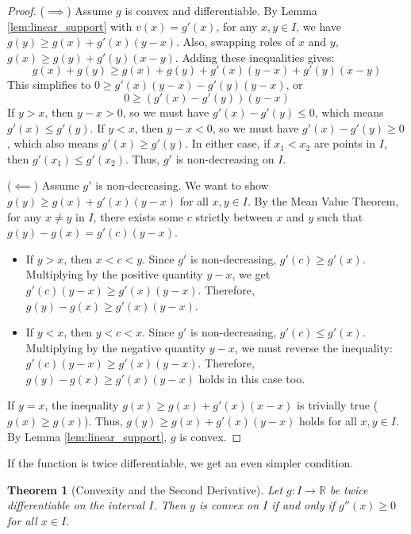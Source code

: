 \documentclass[11pt]{article}
\newtheorem{theorem}{Theorem}[section]
\theoremstyle{definition}
\theoremstyle{remark}
\begin{document}
\begin{proof}
($\implies$) Assume $g$ is convex and differentiable. By Lemma \ref{lem:linear_support} with $v(x)=g'(x)$, for any $x, y \in I$, we have $g(y) \ge g(x) + g'(x)(y-x)$. Also, swapping roles of $x$ and $y$, $g(x) \ge g(y) + g'(y)(x-y)$. Adding these inequalities gives:
\[ g(x)+g(y) \ge g(x)+g(y) + g'(x)(y-x) + g'(y)(x-y) \]
This simplifies to $0 \ge g'(x)(y-x) - g'(y)(y-x)$, or
\[ 0 \ge (g'(x) - g'(y))(y-x) \]
If $y > x$, then $y-x > 0$, so we must have $g'(x) - g'(y) \le 0$, which means $g'(x) \le g'(y)$.
If $y < x$, then $y-x < 0$, so we must have $g'(x) - g'(y) \ge 0$, which also means $g'(x) \ge g'(y)$.
In either case, if $x_1 < x_2$ are points in $I$, then $g'(x_1) \le g'(x_2)$. Thus, $g'$ is non-decreasing on $I$.

($\impliedby$) Assume $g'$ is non-decreasing. We want to show $g(y) \ge g(x) + g'(x)(y-x)$ for all $x, y \in I$. By the Mean Value Theorem, for any $x \neq y$ in $I$, there exists some $c$ strictly between $x$ and $y$ such that $g(y) - g(x) = g'(c)(y-x)$.
\begin{itemize}
    \item If $y > x$, then $x < c < y$. Since $g'$ is non-decreasing, $g'(c) \ge g'(x)$. Multiplying by the positive quantity $y-x$, we get $g'(c)(y-x) \ge g'(x)(y-x)$. Therefore, $g(y) - g(x) \ge g'(x)(y-x)$.
    \item If $y < x$, then $y < c < x$. Since $g'$ is non-decreasing, $g'(c) \le g'(x)$. Multiplying by the negative quantity $y-x$, we must reverse the inequality: $g'(c)(y-x) \ge g'(x)(y-x)$. Therefore, $g(y) - g(x) \ge g'(x)(y-x)$ holds in this case too.
\end{itemize}
If $y=x$, the inequality $g(x) \ge g(x) + g'(x)(x-x)$ is trivially true ($g(x) \ge g(x)$).
Thus, $g(y) \ge g(x) + g'(x)(y-x)$ holds for all $x, y \in I$. By Lemma \ref{lem:linear_support}, $g$ is convex.
\end{proof}

If the function is twice differentiable, we get an even simpler condition.

\begin{theorem}[Convexity and the Second Derivative] \label{thm:second_deriv}
Let $g: I \to \mathbb{R}$ be twice differentiable on the interval $I$. Then $g$ is convex on $I$ if and only if $g''(x) \ge 0$ for all $x \in I$.
\end{theorem}
\end{document}
